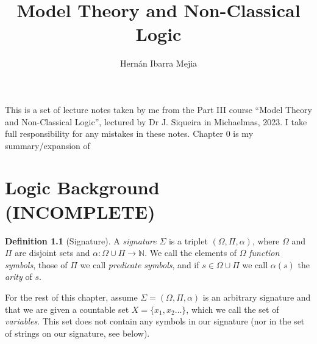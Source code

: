 \documentclass{report}
\theoremstyle{definition}
\theoremstyle{plain}
\theoremstyle{definition}
\newtheorem{defn}[thm]{Definition}
\begin{document}
	\title{Model Theory and Non-Classical Logic}
	\author{Hernán Ibarra Mejia}
	\maketitle
	This is a set of lecture notes taken by me from the Part III course ``Model Theory and Non-Classical Logic'', lectured by Dr J. Siqueira in Michaelmas, 2023. I take full responsibility for any mistakes in these notes. Chapter 0 is my summary/expansion of \cite{NOLAST}
	
	
	\setcounter{chapter}{-1}
	\chapter{Logic Background (INCOMPLETE)}
	\begin{defn}[Signature]
		A \emph{signature} $\Sigma$ is a triplet $(\Omega, \Pi, \alpha)$, where $\Omega$ and $\Pi$ are disjoint sets and $\alpha\colon \Omega \cup \Pi \to \mathbb{N}$. We call the elements of $\Omega$ \emph{function symbols}, those of $\Pi$ we call \emph{predicate symbols}, and if $s\in \Omega \cup \Pi$ we call $\alpha(s)$ the \emph{arity} of $s$.
	\end{defn}
	For the rest of this chapter, assume $\Sigma = (\Omega, \Pi, \alpha)$ is an arbitrary signature and that we are given a countable set $X=\{x_1,x_2\ldots\}$, which we call the set of \emph{variables}. This set does not contain any symbols in our signature (nor in the set of strings on our signature, see below).
\end{document}
